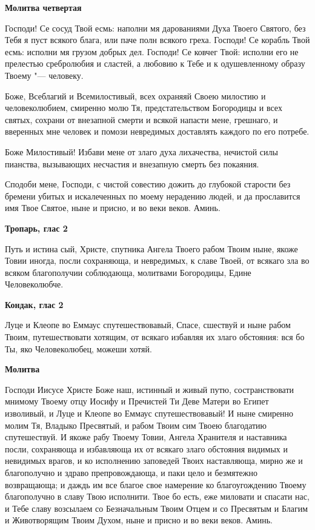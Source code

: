 \bfseries Молитва четвертая\normalfont{}


Господи! Се сосуд Твой есмь: наполни мя дарованиями Духа Твоего Святого, без Тебя я пуст всякого блага, или паче полн всякого греха. Господи! Се корабль Твой есмь: исполни мя грузом добрых дел. Господи! Се ковчег Твой: исполни его не прелестью сребролюбия и сластей, а любовию к Тебе и к одушевленному образу Твоему "--- человеку.


\mychapterending




Боже, Всеблагий и Всемилостивый, всех охраняяй Своею милостию и человеколюбием, смиренно молю Тя, предстательством Богородицы и всех святых, сохрани от внезапной смерти и всякой напасти мене, грешнаго, и вверенных мне человек и помози невредимых доставлять каждого по его потребе.


Боже Милостивый! Избави мене от злаго духа лихачества, нечистой силы пианства, вызывающих несчастия и внезапную смерть без покаяния.


Сподоби мене, Господи, с чистой совестию дожить до глубокой старости без бремени убитых и искалеченных по моему нерадению людей, и да прославится имя Твое Святое, ныне и присно, и во веки веков. Аминь.


\mychapterending




\bfseries Тропарь, глас 2\normalfont{}


Путь и истина сый, Христе, спутника Ангела Твоего рабом Твоим ныне, якоже Товии иногда, посли сохраняюща, и невредимых, к славе Твоей, от всякаго зла во всяком благополучии соблюдающа, молитвами Богородицы, Едине Человеколюбче. 


\medskip


\bfseries Кондак, глас 2\normalfont{}


Луце и Клеопе во Еммаус спутешествовавый, Спасе, сшествуй и ныне рабом Твоим, путешествовати хотящим, от всякаго избавляя их злаго обстояния: вся бо Ты, яко Человеколюбец, можеши хотяй.


\medskip


\bfseries Молитва\normalfont{}


Господи Иисусе Христе Боже наш, истинный и живый путю, состранствовати мнимому Твоему отцу Иосифу и Пречистей Ти Деве Матери во Египет изволивый, и Луце и Клеопе во Еммаус спутешествовавый! И ныне смиренно молим Тя, Владыко Пресвятый, и рабом Твоим сим Твоею благодатию спутешествуй. И якоже рабу Твоему Товии, Ангела Хранителя и наставника посли, сохраняюща и избавляюща их от всякаго злаго обстояния видимых и невидимых врагов, и ко исполнению заповедей Твоих наставляюща, мирно же и благополучно и здраво препровождающа, и паки цело и безмятежно возвращающа; и даждь им все благое свое намерение ко благоугождению Твоему благополучно в славу Твою исполнити. Твое бо есть, еже миловати и спасати нас, и Тебе славу возсылаем со Безначальным Твоим Отцем и со Пресвятым и Благим и Животворящим Твоим Духом, ныне и присно и во веки веков. Аминь.


